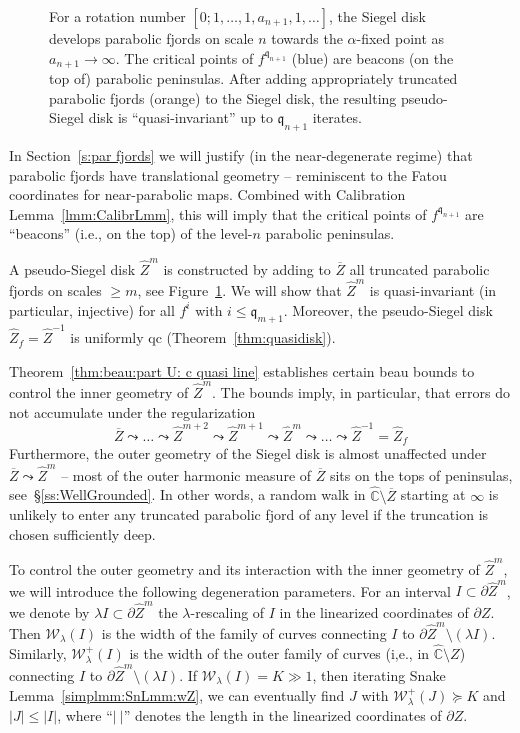 \documentclass{amsart}
\newcommand{\1}{{\mathbb 1 }}
\newcommand{\Width}{{\mathcal W}}
\newcommand{\wZ}{{\widehat Z}}
\newcommand{\qq}{\mathfrak{q}}
\newcommand{\wC}{\widehat{\mathbb{C}}}
\theoremstyle{remark}
\numberwithin{equation}{section}
\theoremstyle{definition}
\begin{document}
\begin{figure}
\begin{tikzpicture}[scale=0.6, every node/.style={scale=0.6}]
\end{tikzpicture}

\caption{For a rotation number $[0;1,\dots, 1,a_{n+1},1,\dots]$, the Siegel disk develops parabolic fjords on scale $n$ towards the $\alpha$-fixed point as $a_{n+1}\to \infty$.  The critical points of $f^{\qq_{n+1}}$ (blue) are beacons (on the top of) parabolic peninsulas. After adding appropriately truncated parabolic fjords (orange) to the Siegel disk, the resulting pseudo-Siegel disk is ``quasi-invariant'' up to $\qq_{n+1}$ iterates.}
\label{fig:fjords}
\end{figure}


In Section~\ref{s:par fjords} we will justify (in the near-degenerate regime) that parabolic fjords have translational geometry -- reminiscent to the Fatou coordinates for near-parabolic maps. Combined with Calibration Lemma~\ref{lmm:CalibrLmm}, this will imply that the critical points of $f^{\qq_{n+1}}$ are ``beacons'' (i.e., on the top) of the level-$n$ parabolic peninsulas.  

A pseudo-Siegel disk $\wZ^m$ is constructed by adding to $\overline Z$ all truncated parabolic fjords on scales $\ge m$, see Figure~\ref{fig:fjords}. We will show that $\wZ^m$ is quasi-invariant (in particular, injective) for all $f^i$ with $i\le \qq_{m+1}$. Moreover, the pseudo-Siegel disk $\wZ_f=\wZ^{-1}$ is uniformly qc (Theorem~\ref{thm:quasidisk}).



  Theorem~\ref{thm:beau:part U: c quasi line} establishes certain beau bounds to control the inner geometry of $\wZ^m$. The bounds imply, in particular, that errors do not accumulate under the regularization \[\overline Z \leadsto
\dots \leadsto \wZ^{m+2}\leadsto \wZ^{m+1} \leadsto \wZ^{m}\leadsto \dots\leadsto \wZ^{-1}=\wZ_f\]
Furthermore, the outer geometry of the Siegel disk is almost unaffected under $\overline Z  \leadsto \wZ^m$ -- most of the outer harmonic measure of $\overline Z$ sits on the tops of peninsulas, see~\S\ref{ss:WellGrounded}. In other words, a random walk in $\wC\setminus \overline Z$ starting at $\infty$ is unlikely to enter any truncated parabolic fjord of any level if the truncation is chosen sufficiently deep.


To control the outer geometry and its interaction with the inner geometry of $\wZ^m$, we will introduce the following degeneration parameters. For an interval $I\subset \partial \wZ^m$, we denote by $\lambda I\subset \partial \wZ^m$ the $\lambda$-rescaling of $I$ in the linearized coordinates of $\partial Z$. Then $\Width_\lambda(I)$ is the width of the family of curves connecting $I$ to $\partial \wZ^m \setminus (\lambda I)$. Similarly, $\Width^+_\lambda(I)$ is the width of the outer family of curves (i,e., in $\wC\setminus Z$) connecting $I$ to $\partial \wZ^m \setminus (\lambda I)$. If $\Width_\lambda(I) = K\gg 1$, then iterating Snake Lemma~\ref{simplmm:SnLmm:wZ}, we can eventually find $J$ with $\Width^+_{\lambda}(J)\succeq K$ and $|J|\le |I|$, where ``$|\ |$'' denotes the length in the linearized coordinates of $\partial Z$.
\end{document}

